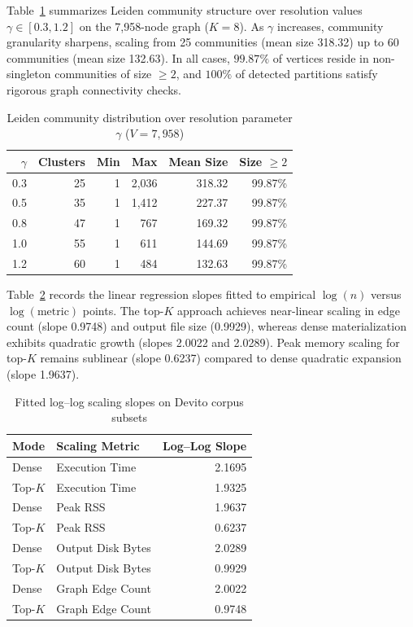 \documentclass[conference]{IEEEtran}
\begin{document}
Table~\ref{tab:resolution} summarizes Leiden community structure over resolution values $\gamma \in [0.3, 1.2]$ on the 7,958-node graph ($K=8$). As $\gamma$ increases, community granularity sharpens, scaling from 25 communities (mean size 318.32) up to 60 communities (mean size 132.63). In all cases, $99.87\%$ of vertices reside in non-singleton communities of size $\ge 2$, and $100\%$ of detected partitions satisfy rigorous graph connectivity checks.

\begin{table}[!t]
\caption{Leiden community distribution over resolution parameter $\gamma$ ($V=7,958$)}
\label{tab:resolution}\centering\scriptsize
\setlength{\tabcolsep}{3.5pt}
\begin{tabularx}{\columnwidth}{r r r r r r}\toprule
$\gamma$ & Clusters & Min & Max & Mean Size & Size $\ge 2$ \\ \midrule
0.3 & 25 & 1 & 2,036 & 318.32 & 99.87\% \\
0.5 & 35 & 1 & 1,412 & 227.37 & 99.87\% \\
0.8 & 47 & 1 & 767 & 169.32 & 99.87\% \\
1.0 & 55 & 1 & 611 & 144.69 & 99.87\% \\
1.2 & 60 & 1 & 484 & 132.63 & 99.87\% \\
\bottomrule\end{tabularx}
\end{table}

Table~\ref{tab:slopes} records the linear regression slopes fitted to empirical $\log(n)$ versus $\log(\mathrm{metric})$ points. The top-$K$ approach achieves near-linear scaling in edge count (slope 0.9748) and output file size (0.9929), whereas dense materialization exhibits quadratic growth (slopes 2.0022 and 2.0289). Peak memory scaling for top-$K$ remains sublinear (slope 0.6237) compared to dense quadratic expansion (slope 1.9637).

\begin{table}[!t]
\caption{Fitted log--log scaling slopes on Devito corpus subsets}
\label{tab:slopes}\centering\scriptsize
\setlength{\tabcolsep}{4pt}
\begin{tabularx}{\columnwidth}{l X r}\toprule
Mode & Scaling Metric & Log--Log Slope \\ \midrule
Dense & Execution Time & 2.1695 \\
Top-$K$ & Execution Time & 1.9325 \\
Dense & Peak RSS & 1.9637 \\
Top-$K$ & Peak RSS & 0.6237 \\
Dense & Output Disk Bytes & 2.0289 \\
Top-$K$ & Output Disk Bytes & 0.9929 \\
Dense & Graph Edge Count & 2.0022 \\
Top-$K$ & Graph Edge Count & 0.9748 \\
\bottomrule\end{tabularx}
\end{table}
\end{document}
